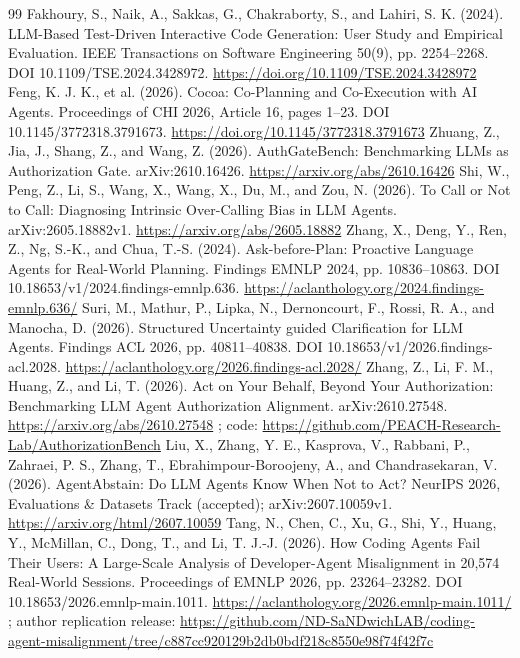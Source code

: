 \begin{thebibliography}{99}
 Fakhoury, S., Naik, A., Sakkas, G., Chakraborty, S., and Lahiri, S. K. (2024). LLM-Based Test-Driven Interactive Code Generation: User Study and Empirical Evaluation. IEEE Transactions on Software Engineering 50(9), pp. 2254--2268. DOI 10.1109/TSE.2024.3428972. \url{https://doi.org/10.1109/TSE.2024.3428972}
 Feng, K. J. K., et al. (2026). Cocoa: Co-Planning and Co-Execution with AI Agents. Proceedings of CHI 2026, Article 16, pages 1--23. DOI 10.1145/3772318.3791673. \url{https://doi.org/10.1145/3772318.3791673}
 Zhuang, Z., Jia, J., Shang, Z., and Wang, Z. (2026). AuthGateBench: Benchmarking LLMs as Authorization Gate. arXiv:2610.16426. \url{https://arxiv.org/abs/2610.16426}
 Shi, W., Peng, Z., Li, S., Wang, X., Wang, X., Du, M., and Zou, N. (2026). To Call or Not to Call: Diagnosing Intrinsic Over-Calling Bias in LLM Agents. arXiv:2605.18882v1. \url{https://arxiv.org/abs/2605.18882}
 Zhang, X., Deng, Y., Ren, Z., Ng, S.-K., and Chua, T.-S. (2024). Ask-before-Plan: Proactive Language Agents for Real-World Planning. Findings EMNLP 2024, pp. 10836--10863. DOI 10.18653/v1/2024.findings-emnlp.636. \url{https://aclanthology.org/2024.findings-emnlp.636/}
 Suri, M., Mathur, P., Lipka, N., Dernoncourt, F., Rossi, R. A., and Manocha, D. (2026). Structured Uncertainty guided Clarification for LLM Agents. Findings ACL 2026, pp. 40811--40838. DOI 10.18653/v1/2026.findings-acl.2028. \url{https://aclanthology.org/2026.findings-acl.2028/}
 Zhang, Z., Li, F. M., Huang, Z., and Li, T. (2026). Act on Your Behalf, Beyond Your Authorization: Benchmarking LLM Agent Authorization Alignment. arXiv:2610.27548. \url{https://arxiv.org/abs/2610.27548} ; code: \url{https://github.com/PEACH-Research-Lab/AuthorizationBench}
 Liu, X., Zhang, Y. E., Kasprova, V., Rabbani, P., Zahraei, P. S., Zhang, T., Ebrahimpour-Boroojeny, A., and Chandrasekaran, V. (2026). AgentAbstain: Do LLM Agents Know When Not to Act? NeurIPS 2026, Evaluations \& Datasets Track (accepted); arXiv:2607.10059v1. \url{https://arxiv.org/html/2607.10059}
 Tang, N., Chen, C., Xu, G., Shi, Y., Huang, Y., McMillan, C., Dong, T., and Li, T. J.-J. (2026). How Coding Agents Fail Their Users: A Large-Scale Analysis of Developer-Agent Misalignment in 20,574 Real-World Sessions. Proceedings of EMNLP 2026, pp. 23264--23282. DOI 10.18653/2026.emnlp-main.1011. \url{https://aclanthology.org/2026.emnlp-main.1011/} ; author replication release: \url{https://github.com/ND-SaNDwichLAB/coding-agent-misalignment/tree/c887cc920129b2db0bdf218c8550e98f74f42f7c}

\end{thebibliography}
